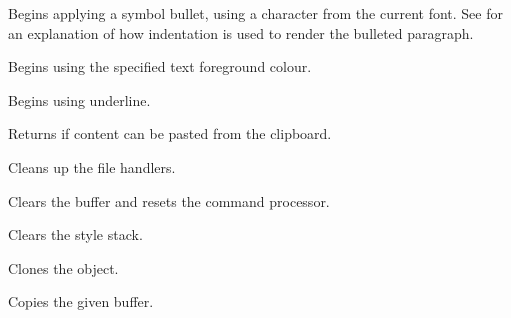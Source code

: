 Begins applying a symbol bullet, using a character from the current font. See  for
an explanation of how indentation is used to render the bulleted paragraph.

\label{wxrichtextbufferbegintextcolour}


Begins using the specified text foreground colour.

\label{wxrichtextbufferbeginunderline}


Begins using underline.

\label{wxrichtextbuffercanpastefromclipboard}


Returns \true if content can be pasted from the clipboard.

\label{wxrichtextbuffercleanuphandlers}


Cleans up the file handlers.

\label{wxrichtextbufferclear}


Clears the buffer and resets the command processor.

\label{wxrichtextbufferclearstylestack}


Clears the style stack.

\label{wxrichtextbufferclone}


Clones the object.

\label{wxrichtextbuffercopy}


Copies the given buffer.

\label{wxrichtextbuffercopytoclipboard}

